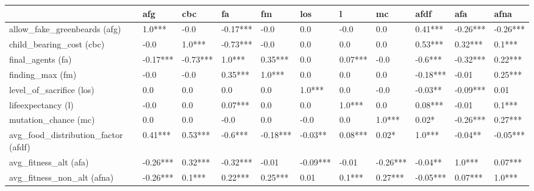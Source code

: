 \begin{tabular}{lllllllllll}
    \toprule
    {}                                     & afg      & cbc      & fa       & fm       & los      & l       & mc       & afdf     & afa      & afna          \\
    \midrule
    allow\_fake\_greenbeards (afg)         & 1.0***   & -0.0     & -0.17*** & -0.0     & 0.0      & -0.0    & 0.0      & 0.41***  & -0.26*** & -0.26***     \\
    child\_bearing\_cost (cbc)             & -0.0     & 1.0***   & -0.73*** & -0.0     & 0.0      & 0.0     & 0.0      & 0.53***  & 0.32***  & 0.1***       \\
    final\_agents (fa)                     & -0.17*** & -0.73*** & 1.0***   & 0.35***  & 0.0      & 0.07*** & -0.0     & -0.6***  & -0.32*** & 0.22***      \\
    finding\_max (fm)                      & -0.0     & -0.0     & 0.35***  & 1.0***   & 0.0      & 0.0     & 0.0      & -0.18*** & -0.01    & 0.25***      \\
    level\_of\_sacrifice (los)             & 0.0      & 0.0      & 0.0      & 0.0      & 1.0***   & 0.0     & -0.0     & -0.03**  & -0.09*** & 0.01         \\
    lifeexpectancy (l)                     & -0.0     & 0.0      & 0.07***  & 0.0      & 0.0      & 1.0***  & 0.0      & 0.08***  & -0.01    & 0.1***       \\
    mutation\_chance (mc)                  & 0.0      & 0.0      & -0.0     & 0.0      & -0.0     & 0.0     & 1.0***   & 0.02*    & -0.26*** & 0.27***      \\
    avg\_food\_distribution\_factor (afdf) & 0.41***  & 0.53***  & -0.6***  & -0.18*** & -0.03**  & 0.08*** & 0.02*    & 1.0***   & -0.04**  & -0.05***      \\
    avg\_fitness\_alt (afa)                & -0.26*** & 0.32***  & -0.32*** & -0.01    & -0.09*** & -0.01   & -0.26*** & -0.04**  & 1.0***   & 0.07***      \\
    avg\_fitness\_non\_alt (afna)          & -0.26*** & 0.1***   & 0.22***  & 0.25***  & 0.01     & 0.1***  & 0.27***  & -0.05*** & 0.07***  & 1.0***       \\
    \bottomrule
\end{tabular}
